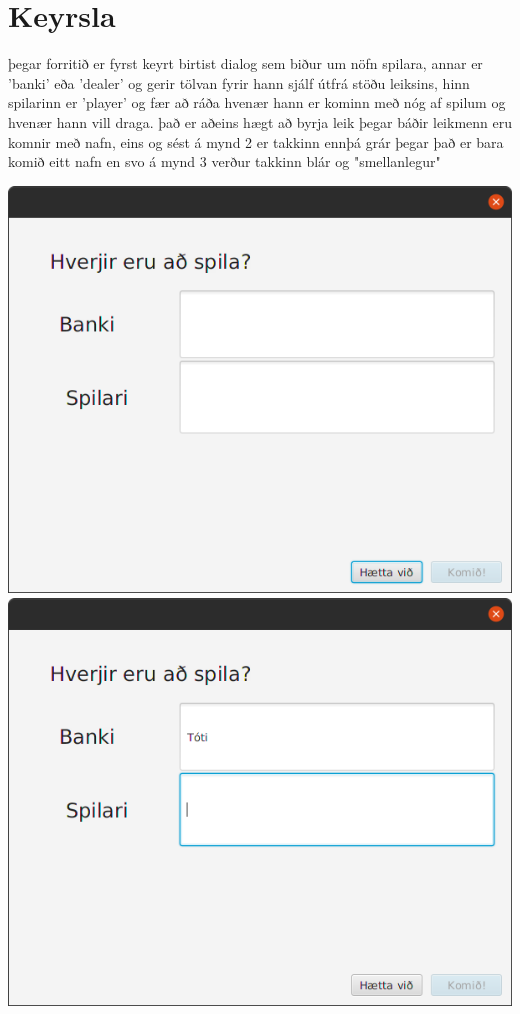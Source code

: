 \documentclass{article}
\begin{document}
\section*{Keyrsla}
þegar forritið er fyrst keyrt birtist dialog sem biður um nöfn spilara, annar er 'banki' eða 'dealer' og gerir tölvan fyrir hann sjálf útfrá stöðu leiksins, hinn spilarinn er 'player' og fær að ráða hvenær hann er kominn með nóg af spilum og hvenær hann vill draga.
það er aðeins hægt að byrja leik þegar báðir leikmenn eru komnir með nafn, eins og sést á mynd 2 er takkinn ennþá grár þegar það er bara komið eitt nafn en svo á mynd 3 verður takkinn blár og "smellanlegur" 
\begin{center}
    \includegraphics[scale=0.27]{dialog.png}
    \includegraphics[scale=0.27]{dialog2.png}

\end{center}
\end{document}
